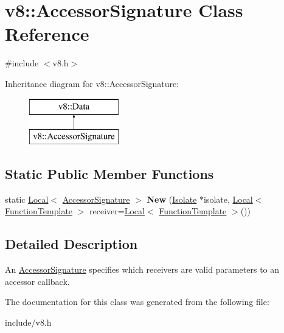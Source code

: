 \hypertarget{classv8_1_1_accessor_signature}{}\section{v8\+:\+:Accessor\+Signature Class Reference}
\label{classv8_1_1_accessor_signature}


{\ttfamily \#include $<$v8.\+h$>$}

Inheritance diagram for v8\+:\+:Accessor\+Signature\+:\begin{figure}[H]
\begin{center}
\leavevmode
\includegraphics[height=2.000000cm]{classv8_1_1_accessor_signature}
\end{center}
\end{figure}
\subsection*{Static Public Member Functions}
\begin{DoxyCompactItemize}
\item 
static \hyperlink{classv8_1_1_local}{Local}$<$ \hyperlink{classv8_1_1_accessor_signature}{Accessor\+Signature} $>$ {\bfseries New} (\hyperlink{classv8_1_1_isolate}{Isolate} $\ast$isolate, \hyperlink{classv8_1_1_local}{Local}$<$ \hyperlink{classv8_1_1_function_template}{Function\+Template} $>$ receiver=\hyperlink{classv8_1_1_local}{Local}$<$ \hyperlink{classv8_1_1_function_template}{Function\+Template} $>$())\hypertarget{classv8_1_1_accessor_signature_a2d7f28b404be5ecdb501aaf572a7ee52}{}\label{classv8_1_1_accessor_signature_a2d7f28b404be5ecdb501aaf572a7ee52}

\end{DoxyCompactItemize}


\subsection{Detailed Description}
An \hyperlink{classv8_1_1_accessor_signature}{Accessor\+Signature} specifies which receivers are valid parameters to an accessor callback. 

The documentation for this class was generated from the following file\+:\begin{DoxyCompactItemize}
\item 
include/v8.\+h\end{DoxyCompactItemize}
